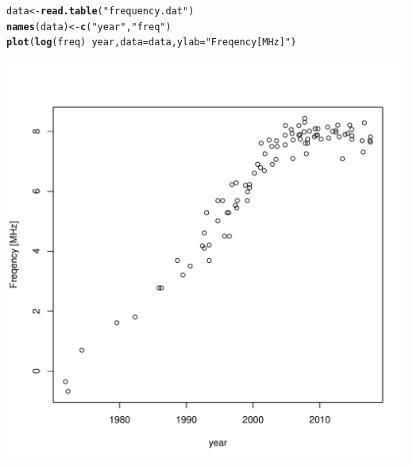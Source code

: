 \documentclass{article}\usepackage[]{graphicx}\usepackage[]{color}
\makeatletter
\def\maxwidth{ %
  \ifdim\Gin@nat@width>\linewidth
    \linewidth
  \else
    \Gin@nat@width
  \fi
}
\newcommand{\hlstr}[1]{\textcolor[rgb]{0.192,0.494,0.8}{#1}}%
\newcommand{\hlopt}[1]{\textcolor[rgb]{0,0,0}{#1}}%
\newcommand{\hlstd}[1]{\textcolor[rgb]{0.345,0.345,0.345}{#1}}%
\newcommand{\hlkwb}[1]{\textcolor[rgb]{0.69,0.353,0.396}{#1}}%
\newcommand{\hlkwc}[1]{\textcolor[rgb]{0.333,0.667,0.333}{#1}}%
\newcommand{\hlkwd}[1]{\textcolor[rgb]{0.737,0.353,0.396}{\textbf{#1}}}%
\newenvironment{kframe}{%
 \def\at@end@of@kframe{}%
 \ifinner\ifhmode%
  \def\at@end@of@kframe{\end{minipage}}%
  \begin{minipage}{\columnwidth}%
 \fi\fi%
 \def\FrameCommand##1{\hskip\@totalleftmargin \hskip-\fboxsep
 \colorbox{shadecolor}{##1}\hskip-\fboxsep
     \hskip-\linewidth \hskip-\@totalleftmargin \hskip\columnwidth}%
 \MakeFramed {\advance\hsize-\width
   \@totalleftmargin\z@ \linewidth\hsize
   \@setminipage}}%
 {\par\unskip\endMakeFramed%
 \at@end@of@kframe}
\newenvironment{knitrout}{}{} %
\makeatother
\begin{document}
\begin{knitrout}
\color{fgcolor}\begin{kframe}
\begin{alltt}
\hlstd{data} \hlkwb{<-} \hlkwd{read.table}\hlstd{(}\hlstr{"frequency.dat"}\hlstd{)}
\hlkwd{names}\hlstd{(data)} \hlkwb{<-} \hlkwd{c}\hlstd{(}\hlstr{"year"}\hlstd{,} \hlstr{"freq"}\hlstd{)}
\hlkwd{plot}\hlstd{(}\hlkwd{log}\hlstd{(freq)} \hlopt{~} \hlstd{year,} \hlkwc{data} \hlstd{= data,} \hlkwc{ylab} \hlstd{=} \hlstr{"Freqency [MHz]"}\hlstd{)}
\end{alltt}
\end{kframe}
\includegraphics[width=\maxwidth]{figure/unnamed-chunk-1-1} 

\end{knitrout}
\end{document}
